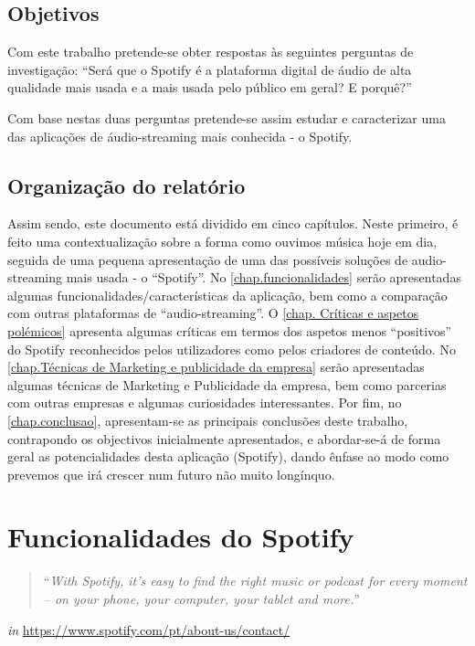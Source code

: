 \documentclass{report}
\begin{document}
\section{Objetivos}
Com este trabalho pretende-se obter respostas às seguintes perguntas de investigação: ``Será que o Spotify é a plataforma digital de áudio de alta qualidade mais usada e a mais usada pelo público em geral? E porquê?''

Com base nestas duas perguntas pretende-se assim estudar e caracterizar uma das aplicações de áudio-streaming mais conhecida - o Spotify.


\section{Organização do relatório}
Assim sendo, este documento está dividido em cinco capítulos. 
Neste primeiro, é feito uma contextualização sobre a forma como ouvimos música hoje em dia, seguida de uma pequena apresentação de uma das possíveis soluções de audio-streaming mais usada - o ``Spotify''. No \autoref{chap.funcionalidades} serão apresentadas algumas funcionalidades/características da aplicação, bem como a comparação com outras plataformas de ``audio-streaming''. O \autoref{chap. Críticas e aspetos polémicos} apresenta algumas críticas em termos dos aspetos menos ``positivos'' do Spotify reconhecidos pelos utilizadores como pelos criadores de conteúdo. No \autoref{chap.Técnicas de Marketing e publicidade da empresa} serão apresentadas algumas técnicas de Marketing e Publicidade da empresa, bem como parcerias com outras empresas e algumas curiosidades interessantes.
Por fim, no \autoref{chap.conclusao}, apresentam-se as principais conclusões deste trabalho, contrapondo os objectivos inicialmente apresentados, e abordar-se-á de forma geral as potencialidades desta aplicação (Spotify), dando ênfase ao modo como prevemos que irá crescer num futuro não muito longínquo.



\chapter{Funcionalidades do Spotify}
\label{chap.funcionalidades}
\begin{quote}
``\emph{With Spotify, it’s easy to find the right music or podcast for every moment – on your phone, your computer, your tablet and more.}''
\end{quote}
\begin{flushright}
\emph{in} \url{https://www.spotify.com/pt/about-us/contact/}
\end{flushright}
\end{document}
